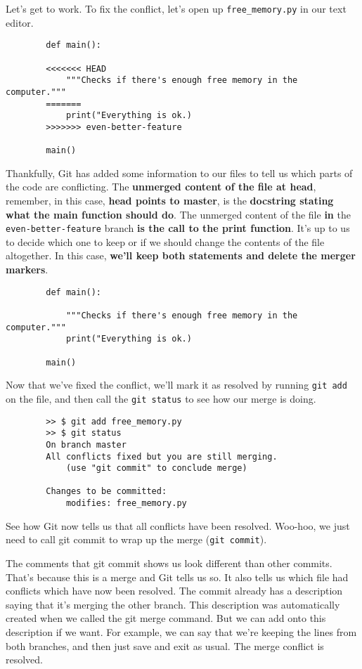 	Let's get to work. To fix the conflict, let's open up \verb|free_memory.py| in our text editor.
	
	\begin{verbatim}
		def main():
			
		<<<<<<< HEAD
			"""Checks if there's enough free memory in the computer."""
		=======
			print("Everything is ok.)
		>>>>>>> even-better-feature
		
		main()		
	\end{verbatim}
	
	Thankfully, Git has added some information to our files to tell us which parts of the code are conflicting. The \textbf{unmerged content of the file at head}, remember, in this case, \textbf{head points to master}, is the \textbf{docstring stating what the main function should do}. The unmerged content of the file \textbf{in} the \verb|even-better-feature| branch \textbf{is the call to the print function}. It's up to us to decide which one to keep or if we should change the contents of the file altogether. 
	In this case, \textbf{we'll keep both statements and delete the merger markers}.
	
	\begin{verbatim}
		def main():		
	
			"""Checks if there's enough free memory in the computer."""
			print("Everything is ok.)
		
		main()		
	\end{verbatim}
	
	
	Now that we've fixed the conflict, we'll mark it as resolved by running \texttt{git add} on the file, and then call the \texttt{git status} to see how our merge is doing. 
	
	\begin{verbatim}
		>> $ git add free_memory.py
		>> $ git status
		On branch master
		All conflicts fixed but you are still merging.
			(use "git commit" to conclude merge)
		
		Changes to be committed:
			modifies: free_memory.py
	\end{verbatim}
	
	
	See how Git now tells us that all conflicts have been resolved. Woo-hoo, we just need to call git commit to wrap up the merge (\texttt{git commit}).
	
	The comments that git commit shows us look different than other commits. That's because this is a merge and Git tells us so. It also tells us which file had conflicts which have now been resolved. The commit already has a description saying that it's merging the other branch. This description was automatically created when we called the git merge command. But we can add onto this description if we want. For example, we can say that we're keeping the lines from both branches, and then just save and exit as usual. The merge conflict is resolved. 
	
